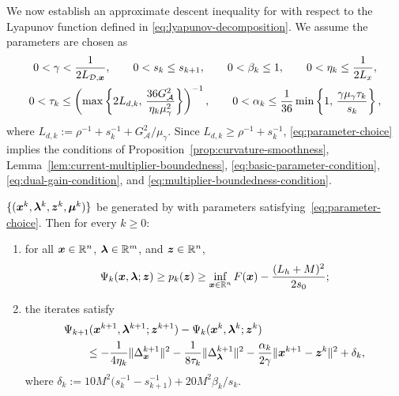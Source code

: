 We now establish an approximate descent inequality for
 with respect to the Lyapunov function defined in \eqref{eq:lyapunov-decomposition}. We assume 
the parameters are chosen as
\begin{equation}
\label{eq:parameter-choice}
\begin{gathered}
    0<\gamma<\frac{1}{2L_{\mathcal{D},\bm{x}}},\qquad
    0<s_k\le s_{k+1},\qquad
    0<\beta_k\le1,\qquad
    0<\eta_k\le\frac{1}{2L_x},\\
    0<\tau_k\le\left(\max\left\{2L_{d,k},\,
        \frac{36G_{\mathcal A}^2}{\eta_k\mu_\gamma^2}\right\}\right)^{-1},\qquad
    0<\alpha_k\le\frac1{36}\min\left\{1,\,
        \frac{\gamma\mu_\gamma\tau_k}{s_k}\right\},
\end{gathered}
\end{equation}
where $L_{d,k}:=\rho^{-1}+s_k^{-1}+G_{\mathcal A}^2/\mu_\gamma$.
Since $L_{d,k}\ge\rho^{-1}+s_k^{-1}$, \eqref{eq:parameter-choice} implies the conditions of Proposition~\ref{prop:curvature-smoothness},
Lemma~\ref{lem:current-multiplier-boundedness},
\eqref{eq:basic-parameter-condition},
\eqref{eq:dual-gain-condition}, and
\eqref{eq:multiplier-boundedness-condition}.

\begin{lemma}
\label{lem:moving-three-value-descent}
$\{(\bm{x}^k,\bm{\lambda}^k,\bm{z}^k,\bm{\mu}^k)\}$ be generated by 
with parameters satisfying~\eqref{eq:parameter-choice}. Then for every
$k\ge0$:
\begin{enumerate}[label=(\alph*)]
    \item for all $\bm{x}\in\mathbb{R}^n$, $\bm{\lambda}\in\mathbb{R}^m$, and $\bm{z}\in\mathbb{R}^n$,
    \begin{equation}
    \label{eq:current-lyapunov-lower-bound}
        \Psi_k(\bm{x},\bm{\lambda};\bm{z})\ge p_k(\bm{z})
        \ge\inf_{\bm{x}\in\mathbb{R}^n}F(\bm{x})-\frac{(L_h+M)^2}{2s_0};
    \end{equation}
    \item the iterates satisfy
    \begin{equation}
    \label{eq:full-lyapunov-descent}
    \begin{aligned}
        &\Psi_{k+1}(\bm{x}^{k+1},\bm{\lambda}^{k+1};\bm{z}^{k+1})
         -\Psi_k(\bm{x}^k,\bm{\lambda}^k;\bm{z}^k)\\
        &\qquad\le
         -\frac1{4\eta_k}\|\Delta_{\bm{x}}^{k+1}\|^2
         -\frac1{8\tau_k}\|\Delta_{\bm{\lambda}}^{k+1}\|^2
         -\frac{\alpha_k}{2\gamma}\|\bm{x}^{k+1}-\bm{z}^k\|^2
         +\delta_k,
    \end{aligned}
    \end{equation}
    where
    $\delta_k:=10M^2\bigl(s_k^{-1}-s_{k+1}^{-1}\bigr)+20M^2\beta_k/s_k$.
\end{enumerate}
\end{lemma}


